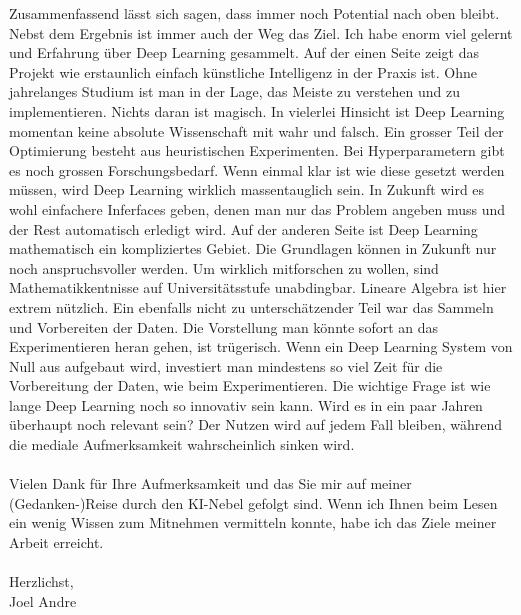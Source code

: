 Zusammenfassend lässt sich sagen, dass immer noch Potential nach oben bleibt. Nebst dem Ergebnis ist immer auch der Weg das Ziel. Ich habe enorm viel gelernt und Erfahrung über Deep Learning gesammelt. Auf der einen Seite zeigt das Projekt wie erstaunlich einfach künstliche Intelligenz in der Praxis ist. Ohne jahrelanges Studium ist man in der Lage, das Meiste zu verstehen und zu implementieren. Nichts daran ist magisch. In vielerlei Hinsicht ist Deep Learning momentan keine absolute Wissenschaft mit wahr und falsch. Ein grosser Teil der Optimierung besteht aus heuristischen Experimenten. Bei Hyperparametern gibt es noch grossen Forschungsbedarf. Wenn einmal klar ist wie diese gesetzt werden müssen, wird Deep Learning wirklich massentauglich sein. In Zukunft wird es wohl einfachere Inferfaces geben, denen man nur das Problem angeben muss und der Rest automatisch erledigt wird. Auf der anderen Seite ist Deep Learning mathematisch ein kompliziertes Gebiet. Die Grundlagen können in Zukunft nur noch anspruchsvoller werden. Um wirklich mitforschen zu wollen, sind Mathematikkentnisse auf Universitätsstufe unabdingbar. Lineare Algebra ist hier extrem nützlich. Ein ebenfalls nicht zu unterschätzender Teil war das Sammeln und Vorbereiten der Daten. Die Vorstellung man könnte sofort an das Experimentieren heran gehen, ist trügerisch. Wenn ein Deep Learning System von Null aus aufgebaut wird, investiert man mindestens so viel Zeit für die Vorbereitung der Daten, wie beim Experimentieren. Die wichtige Frage ist wie lange Deep Learning noch so innovativ sein kann. Wird es in ein paar Jahren überhaupt noch relevant sein? Der Nutzen wird auf jedem Fall bleiben, während die mediale Aufmerksamkeit wahrscheinlich sinken wird.
\\ \\
Vielen Dank für Ihre Aufmerksamkeit und das Sie mir auf meiner (Gedanken-)Reise durch den KI-Nebel gefolgt sind. Wenn ich Ihnen beim Lesen ein wenig Wissen zum Mitnehmen vermitteln konnte, habe ich das Ziele meiner Arbeit erreicht. 
\\ \\
Herzlichst, \\
Joel Andre
